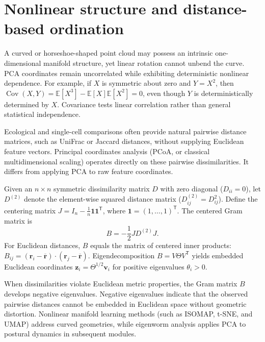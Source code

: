 \section{Nonlinear structure and distance-based ordination}
\label{sec:l05-limitations}
A curved or horseshoe-shaped point cloud may possess an intrinsic one-dimensional manifold structure, yet linear rotation cannot unbend the curve. PCA coordinates remain uncorrelated while exhibiting deterministic nonlinear dependence. For example, if $X$ is symmetric about zero and $Y=X^2$, then $\operatorname{Cov}(X,Y)=\mathbb E[X^3]-\mathbb E[X]\mathbb E[X^2]=0$, even though $Y$ is deterministically determined by $X$. Covariance tests linear correlation rather than general statistical independence.

Ecological and single-cell comparisons often provide natural pairwise distance matrices, such as UniFrac or Jaccard distances, without supplying Euclidean feature vectors. Principal coordinates analysis (PCoA, or classical multidimensional scaling) operates directly on these pairwise dissimilarities. It differs from applying PCA to raw feature coordinates.

Given an $n\times n$ symmetric dissimilarity matrix $D$ with zero diagonal ($D_{ii}=0$), let $D^{(2)}$ denote the element-wise squared distance matrix ($D^{(2)}_{ij}=D_{ij}^2$). Define the centering matrix $J=I_n-\frac1n\mathbf1\mathbf1^{\mathsf T}$, where $\mathbf1=(1,\dots,1)^{\mathsf T}$. The centered Gram matrix is
\begin{equation}
B=-\frac12 JD^{(2)}J.
\label{eq:l05-pcoa}
\end{equation}
For Euclidean distances, $B$ equals the matrix of centered inner products: $B_{ij}=(\mathbf r_i-\overline{\mathbf r})\cdot(\mathbf r_j-\overline{\mathbf r})$. Eigendecomposition $B=V\Theta V^{\mathsf T}$ yields embedded Euclidean coordinates $\mathbf z_i = \Theta^{1/2}\mathbf v_i$ for positive eigenvalues $\theta_i>0$.

When dissimilarities violate Euclidean metric properties, the Gram matrix $B$ develops negative eigenvalues. Negative eigenvalues indicate that the observed pairwise distances cannot be embedded in Euclidean space without geometric distortion. Nonlinear manifold learning methods (such as ISOMAP, t-SNE, and UMAP) address curved geometries, while eigenworm analysis applies PCA to postural dynamics in subsequent modules.

